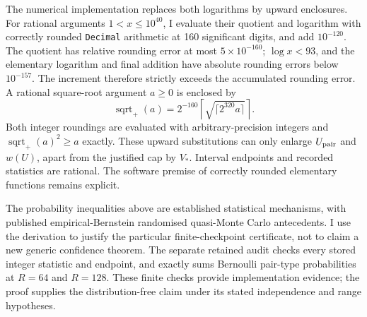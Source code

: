 The numerical implementation replaces both logarithms by upward enclosures.
For rational arguments $1<x\leq10^{40}$, I evaluate their quotient and logarithm
with correctly rounded \texttt{Decimal} arithmetic at 160 significant digits,
and add $10^{-120}$. The quotient has relative rounding error at most
$5\times10^{-160}$; $\log x<93$, and the elementary logarithm and final addition
have absolute rounding errors below $10^{-157}$. The increment therefore
strictly exceeds the accumulated rounding error. A rational square-root
argument $a\geq0$ is enclosed by
\[
 \operatorname{sqrt}_{+}(a)=
  2^{-160}\left\lceil\sqrt{\lceil 2^{320}a\rceil}\right\rceil.
\]
Both integer roundings are evaluated with arbitrary-precision integers and
$\operatorname{sqrt}_{+}(a)^2\geq a$ exactly. These upward substitutions
can only enlarge $U_{\rm pair}$ and $w(U)$, apart from the justified cap by
$V_*$. Interval endpoints and recorded statistics are rational. The software
premise of correctly rounded elementary functions remains explicit.

The probability inequalities above are established statistical mechanisms,
with published empirical-Bernstein randomised quasi-Monte Carlo antecedents.
I use the derivation to justify the particular finite-checkpoint certificate,
not to claim a new generic confidence theorem. The separate retained audit
checks every stored integer statistic and endpoint, and exactly sums
Bernoulli pair-type probabilities at $R=64$ and $R=128$. These finite
checks provide implementation evidence; the proof supplies the distribution-free
claim under its stated independence and range hypotheses.
